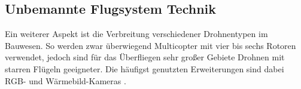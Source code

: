 


\subsection{Unbemannte Flugsystem Technik}


Ein weiterer Aspekt ist die Verbreitung verschiedener Drohnentypen im Bauwesen.
So werden zwar überwiegend Multicopter mit vier bis sechs Rotoren verwendet, jedoch sind für das Überfliegen sehr großer Gebiete Drohnen mit starren Flügeln geeigneter.
Die häufigst genutzten Erweiterungen sind dabei RGB- und Wärmebild-Kameras \cite[S. 90--92]{abaeano2021trends}.


